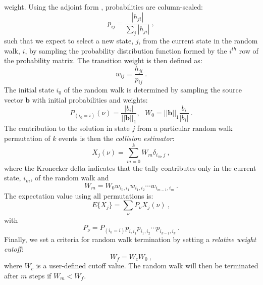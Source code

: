 \documentclass{snamc2013}
\begin{document}
weight. Using the adjoint form \cite{spanier_monte_1969},
probabilities are column-scaled:
\begin{equation}
  p_{ij} = \frac{|h_{ji}|}{\sum_j |h_{ji}|}\:,
  \label{eq:adjoint_probability}
\end{equation}
such that we expect to select a new state, $j$, from the current state
in the random walk, $i$, by sampling the probability distribution
function formed by the $i^{th}$ row of the probability matrix. The
transition weight is then defined as:
\begin{equation}
  w_{ij} = \frac{h_{ji}}{p_{ij}}\:.
  \label{eq:adjoint_weight}
\end{equation}
The initial state $i_0$ of the random walk is determined by sampling
the source vector $\mathbf{b}$ with initial probabilities and weights:
\begin{equation}
  P_{(i_0=i)}(\nu) = \frac{|b_i|}{||\mathbf{b}||_1},\ \ \ W_0 =
  ||\mathbf{b}||_1 \frac{b_i}{|b_i|}\:.
  \label{eq:adjoint_starting_params}
\end{equation}
The contribution to the solution in state $j$ from a particular random
walk permutation of $k$ events is then the \textit{collision
  estimator}:
\begin{equation}
  X_{j}(\nu) = \sum_{m=0}^k W_{m} \delta_{i_m,j}\:,
  \label{eq:adjoint_permutation_contribution}
\end{equation}
where the Kronecker delta indicates that the tally contributes only in
the current state, $i_m$, of the random walk and 
\begin{equation}
  W_{m} = W_0 w_{i_0,i_1} w_{i_1,i_2} \cdots w_{i_{m-1},i_m}\:.
  \label{eq:adjoint_permutation_weight}
\end{equation}
The expectation value using all permutations is:
\begin{equation}
  E\{X_j\} = \sum_{\nu} P_{\nu} X_{j}(\nu)\:,
  \label{eq:adjoint_expectation_value}
\end{equation}
with
\begin{equation}
  P_{\nu} = P_{(i_0=i)} p_{i,i_1} p_{i_1,i_2} \cdots p_{i_{k-1},i_k}\:.
  \label{eq:adjoint_permutation_probability}
\end{equation}
Finally, we set a criteria for random walk termination by setting a
\textit{relative weight cutoff}:
\begin{equation}
  W_f = W_c W_0\:,
  \label{eq:relative_weight_cutoff}
\end{equation}
where $W_c$ is a user-defined cutoff value. The random walk will then
be terminated after $m$ steps if $W_m < W_f$.
\end{document}
